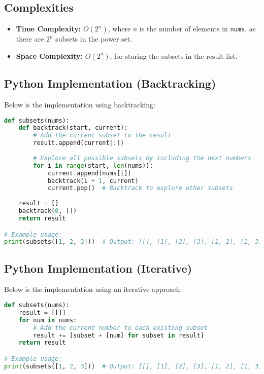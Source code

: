 \subsection*{Complexities}
\begin{itemize}
    \item \textbf{Time Complexity:} \(O(2^n)\), where \(n\) is the number of elements in \texttt{nums}, as there are \(2^n\) subsets in the power set.
    \item \textbf{Space Complexity:} \(O(2^n)\), for storing the subsets in the result list.
\end{itemize}

\subsection*{Python Implementation (Backtracking)}
Below is the implementation using backtracking:

\begin{fullwidth}
\begin{lstlisting}[language=Python]
def subsets(nums):
    def backtrack(start, current):
        # Add the current subset to the result
        result.append(current[:])
        
        # Explore all possible subsets by including the next numbers
        for i in range(start, len(nums)):
            current.append(nums[i])
            backtrack(i + 1, current)
            current.pop()  # Backtrack to explore other subsets
    
    result = []
    backtrack(0, [])
    return result

# Example usage:
print(subsets([1, 2, 3]))  # Output: [[], [1], [2], [3], [1, 2], [1, 3], [2, 3], [1, 2, 3]]
\end{lstlisting}
\end{fullwidth}

\subsection*{Python Implementation (Iterative)}
Below is the implementation using an iterative approach:

\begin{fullwidth}
\begin{lstlisting}[language=Python]
def subsets(nums):
    result = [[]]
    for num in nums:
        # Add the current number to each existing subset
        result += [subset + [num] for subset in result]
    return result

# Example usage:
print(subsets([1, 2, 3]))  # Output: [[], [1], [2], [3], [1, 2], [1, 3], [2, 3], [1, 2, 3]]
\end{lstlisting}
\end{fullwidth}

